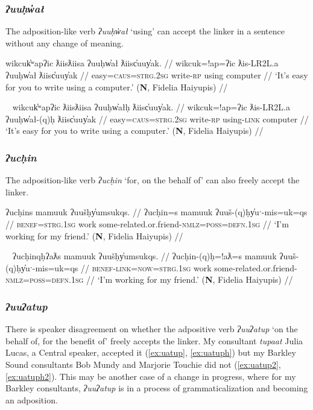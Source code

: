 \subsubsection{\textit{ʔuuḥw̓ał}} \label{ch:link:uuhwal} The adposition-like verb \textit{ʔuuḥw̓ał} `using' can accept the linker in a sentence without any change of meaning.

\ex \label{ex:uuhwal}
\begingl
\glpreamble wikcuk̓ʷapʔic ƛiisƛiisa ʔuuḥw̓ał ƛiisc̓uuy̓ak. //
\gla wikcuk=!ap=ʔic ƛis-LR2L.a ʔuuḥw̓ał ƛiisc̓uuy̓ak //
\glb easy=\textsc{caus}=\textsc{strg.2sg} write-\textsc{rp} using computer //
\glft `It's easy for you to write using a computer.' (\textbf{N}, Fidelia Haiyupis) //
\endgl
\xe

\ex~ \label{ex:uuhwalh}
\begingl
\glpreamble wikcuk̓ʷapʔic ƛiisƛiisa ʔuuḥw̓ałḥ ƛiisc̓uuy̓ak. //
\gla wikcuk=!ap=ʔic ƛis-LR2L.a ʔuuḥw̓ał-(q)ḥ ƛiisc̓uuy̓ak //
\glb easy=\textsc{caus}=\textsc{strg.2sg} write-\textsc{rp} using-\textsc{link} computer //
\glft `It's easy for you to write using a computer.' (\textbf{N}, Fidelia Haiyupis) //
\endgl
\xe

\subsubsection{\textit{ʔucḥin}} \label{ch:link:uuchin} The adposition-like verb \textit{ʔucḥin} `for, on the behalf of' can also freely accept the linker. %

\ex \label{ex:uuchin}
\begingl
\glpreamble ʔucḥins mamuuk ʔuušḥy̓umsukqs. //
\gla ʔucḥin=s mamuuk ʔuuš-(q)ḥy̓uˑ-mis=uk=qs //
\glb \textsc{benef}=\textsc{strg.1sg} work some-related.or.friend-\textsc{nmlz}=\textsc{poss}=\textsc{defn.1sg} //
\glft `I'm working for my friend.' (\textbf{N}, Fidelia Haiyupis) //
\endgl
\xe

\ex~ \label{ex:uuchinqh}
\begingl
\glpreamble ʔucḥinqḥʔaƛs mamuuk ʔuušḥy̓umsukqs. //
\gla ʔucḥin-(q)ḥ=!aƛ=s mamuuk ʔuuš-(q)ḥy̓uˑ-mis=uk=qs //
\glb \textsc{benef}-\textsc{link}=\textsc{now}=\textsc{strg.1sg} work some-related.or.friend-\textsc{nmlz}=\textsc{poss}=\textsc{defn.1sg} //
\glft `I'm working for my friend.' (\textbf{N}, Fidelia Haiyupis) //
\endgl
\xe

\subsubsection{\textit{ʔuuʔatup}} \label{ch:link:uatup} There is speaker disagreement on whether the adpositive verb \textit{ʔuuʔatup} `on the behalf of, for the benefit of' freely accepts the linker. My consultant \textit{tupaat} Julia Lucas, a Central speaker, accepted it (\ref{ex:uatup}, \ref{ex:uatuph}) but my Barkley Sound consultants Bob Mundy and Marjorie Touchie did not (\ref{ex:uatup2}, \ref{ex:uatuph2}). This may be another case of a change in progress, where for my Barkley consultants, \textit{ʔuuʔatup} is in a process of grammaticalization and becoming an adposition.

